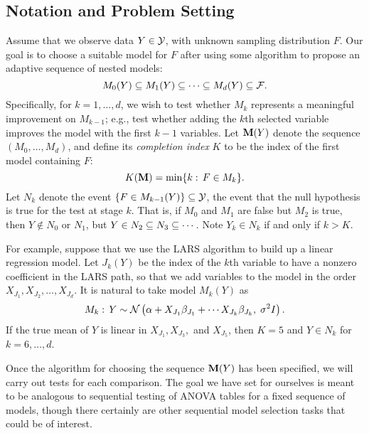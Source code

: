 \documentclass{article}
\begin{document}
\subsection{Notation and Problem Setting}

Assume that we observe data $Y\in\mathcal{Y}$, with unknown sampling distribution $F$. Our goal is to choose a suitable model for $F$ after using some algorithm to propose an adaptive sequence of nested models:
\begin{equation}
  M_0(Y) \subseteq M_1(Y) \subseteq \cdots \subseteq M_d(Y) \subseteq \mathcal{F}.
\end{equation}
Specifically, for $k=1,\ldots,d$, we wish to test whether $M_k$ represents a meaningful improvement on $M_{k-1}$; e.g., test whether adding the $k$th selected variable improves the model with the first $k-1$ variables. Let $\mathbf{M}(Y)$ denote the sequence $(M_0,\ldots,M_d)$, and define its {\em completion index} $K$ to be the index of the first model containing $F$:
\begin{equation}
  K(\mathbf{M}) = \min \{k:\, F\in M_k\}.
\end{equation}
Let $N_k$ denote the event $\{F\in M_{k-1}(Y)\}\subseteq \mathcal{Y}$, the event that the null hypothesis is true for the test at stage $k$. That is, if $M_0$ and $M_1$ are false but $M_2$ is true, then $Y\notin N_0$ or $N_1$, but $Y\in N_2 \subseteq N_3 \subseteq \cdots$. Note $Y_k\in N_k$ if and only if $k>K$.

For example, suppose that we use the LARS algorithm to build up a linear regression model. Let $J_k(Y)$ be the index of the $k$th variable to have a nonzero coefficient in the LARS path, so that we add variables to the model in the order $X_{J_1}, X_{J_2}, \ldots, X_{J_d}$. It is natural to take model $M_k(Y)$ as
\begin{equation}
  M_k:\, Y \sim 
  \mathcal{N}\left(\alpha + X_{J_{1}} \beta_{J_{1}} + \cdots X_{J_k}\beta_{J_k}, 
  \;\sigma^2I\right).
\end{equation}
If the true mean of $Y$ is linear in $X_{J_1}, X_{J_3},$ and $X_{J_5}$, then $K = 5$ and $Y\in N_k$ for $k=6,\ldots,d$.

Once the algorithm for choosing the sequence $\mathbf{M}(Y)$ has been specified, we will carry out tests for each comparison. The goal we have set for ourselves is meant to be analogous to sequential testing of ANOVA tables for a fixed sequence of models, though there certainly are other sequential model selection tasks that could be of interest.
\end{document}

